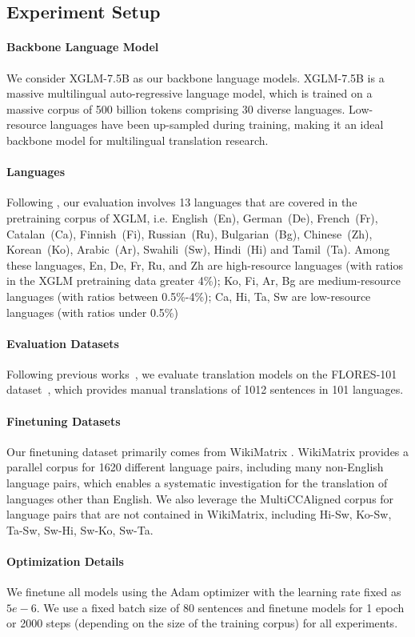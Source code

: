 \subsection{Experiment Setup}

\paragraph{Backbone Language Model}
We consider XGLM-7.5B \citep{lin-etal-2022-shot} as our backbone language models.  XGLM-7.5B is a massive multilingual auto-regressive language model, which is trained on a massive corpus of 500 billion tokens comprising 30 diverse languages. Low-resource languages have been up-sampled during training, making it an ideal backbone model for multilingual translation research.

\paragraph{Languages}
Following \citet{lin-etal-2022-shot}, our evaluation involves 13 languages that are covered in the pretraining corpus of XGLM, i.e. English~(En), German~(De), French~(Fr), Catalan~(Ca), Finnish~(Fi), Russian~(Ru), Bulgarian~(Bg), Chinese~(Zh), Korean~(Ko), Arabic~(Ar), Swahili~(Sw), Hindi~(Hi) and Tamil~(Ta). Among these languages, En, De, Fr, Ru, and Zh are high-resource languages (with ratios in the XGLM pretraining data greater 4\%); Ko, Fi, Ar, Bg are medium-resource languages (with ratios between 0.5\%-4\%); Ca, Hi, Ta, Sw are low-resource languages (with ratios under 0.5\%)

\paragraph{Evaluation Datasets}
Following previous works~\citep{lin-etal-2022-shot}, we evaluate translation models on the FLORES-101 dataset~\citep{goyal-etal-2022-flores}, which provides manual translations of 1012 sentences in 101 languages. 

\paragraph{Finetuning Datasets}
Our finetuning dataset primarily comes from WikiMatrix \citep{wikimatrix}. WikiMatrix provides a parallel corpus for 1620 different language pairs, including many non-English language pairs, which enables a systematic investigation for the translation of languages other than English. We also leverage the MultiCCAligned \citep{elkishky_ccaligned_2020} corpus for language pairs that are not contained in WikiMatrix, including Hi-Sw, Ko-Sw, Ta-Sw, Sw-Hi, Sw-Ko, Sw-Ta. 





\paragraph{Optimization Details}
We finetune all models using the Adam \citep{kingma2017adam} optimizer with the learning rate fixed as $5e-6$. We use a fixed batch size of 80 sentences and finetune models for 1 epoch or 2000 steps (depending on the size of the training corpus) for all experiments. 

